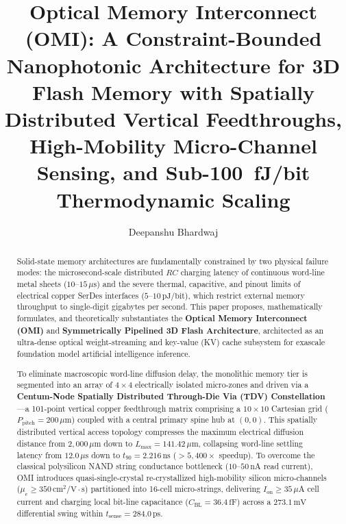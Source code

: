\documentclass[journal]{IEEEtran}
\begin{document}
\title{Optical Memory Interconnect (OMI): A Constraint-Bounded Nanophotonic Architecture for 3D Flash Memory with Spatially Distributed Vertical Feedthroughs, High-Mobility Micro-Channel Sensing, and Sub-100~fJ/bit Thermodynamic Scaling}

\author{Deepanshu Bhardwaj}

\markboth{}{}%

\maketitle

\begin{abstract}
Solid-state memory architectures are fundamentally constrained by two physical failure modes: the microsecond-scale distributed $RC$ charging latency of continuous word-line metal sheets ($10$--$15\,\mu\text{s}$) and the severe thermal, capacitive, and pinout limits of electrical copper SerDes interfaces ($5$--$10\,\text{pJ/bit}$), which restrict external memory throughput to single-digit gigabytes per second. This paper proposes, mathematically formulates, and theoretically substantiates the \textbf{Optical Memory Interconnect (OMI)} and \textbf{Symmetrically Pipelined 3D Flash Architecture}, architected as an ultra-dense optical weight-streaming and key-value (KV) cache subsystem for exascale foundation model artificial intelligence inference.

To eliminate macroscopic word-line diffusion delay, the monolithic memory tier is segmented into an array of $4 \times 4$ electrically isolated micro-zones and driven via a \textbf{Centum-Node Spatially Distributed Through-Die Via (TDV) Constellation}---a 101-point vertical copper feedthrough matrix comprising a $10 \times 10$ Cartesian grid ($P_{\text{pitch}} = 200\,\mu\text{m}$) coupled with a central primary spine hub at $(0, 0)$. This spatially distributed vertical access topology compresses the maximum electrical diffusion distance from $2,000\,\mu\text{m}$ down to $L_{\max} = 141.42\,\mu\text{m}$, collapsing word-line settling latency from $12.0\,\mu\text{s}$ down to $t_{90} = 2.216\,\text{ns}$ ($>5,400\times$ speedup). To overcome the classical polysilicon NAND string conductance bottleneck ($10\text{--}50\,\text{nA}$ read current), OMI introduces quasi-single-crystal re-crystallized high-mobility silicon micro-channels ($\mu_e \ge 350\,\text{cm}^2/\text{V}\cdot\text{s}$) partitioned into 16-cell micro-strings, delivering $I_{\text{on}} \ge 35\,\mu\text{A}$ cell current and charging local bit-line capacitance ($C_{\text{BL}} = 36.4\,\text{fF}$) across a $273.1\,\text{mV}$ differential swing within $t_{\text{sense}} = 284.0\,\text{ps}$.


\end{abstract}
\end{document}
